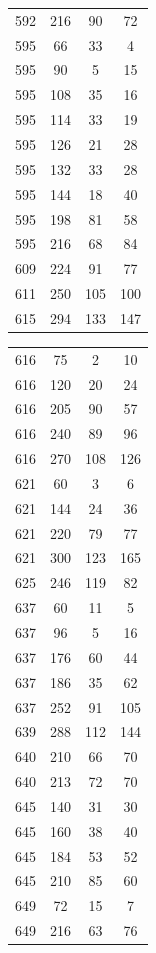 \documentclass[12pt]{amsproc} %
\theoremstyle{definition}\newtheorem{defn}[thm]{Definition}
\theoremstyle{definition}\newtheorem{rem}[thm]{Remark}
\theoremstyle{definition}\newtheorem{ex}[thm]{Example}
\begin{document}
\begin{table}[ht!]
\begin{minipage}{0.25\textwidth}
\begin{tabular}{c|c|c|c}
      592&216&90&72\\ 
      595&66&33&4\\ 
      595&90&5&15\\ 
      595&108&35&16\\ 
      595&114&33&19\\ 
      595&126&21&28\\ 
      595&132&33&28\\ 
      595&144&18&40\\ 
      595&198&81&58\\ 
      595&216&68&84\\ 
      609&224&91&77\\ 
      611&250&105&100\\ 
      615&294&133&147\\ 
        \end{tabular}
    \end{minipage}
    \hfill
    \begin{minipage}{0.25\textwidth}
        \centering
        \begin{tabular}{c|c|c|c} 
      616&75&2&10\\ 
      616&120&20&24\\ 
      616&205&90&57\\
      616&240&89&96\\ 
      616&270&108&126\\ 
      621&60&3&6\\ 
      621&144&24&36\\ 
      621&220&79&77\\ 
      621&300&123&165\\ 
      625&246&119&82\\ 
      637&60&11&5\\ 
      637&96&5&16\\ 
      637&176&60&44\\ 
      637&186&35&62\\ 
      637&252&91&105\\ 
      639&288&112&144\\ 
      640&210&66&70\\ 
      640&213&72&70\\ 
      645&140&31&30\\ 
      645&160&38&40\\ 
      645&184&53&52\\ 
      645&210&85&60\\ 
      649&72&15&7\\ 
      649&216&63&76\\ 

\end{tabular}
\end{minipage}
\end{table}
\end{document}
